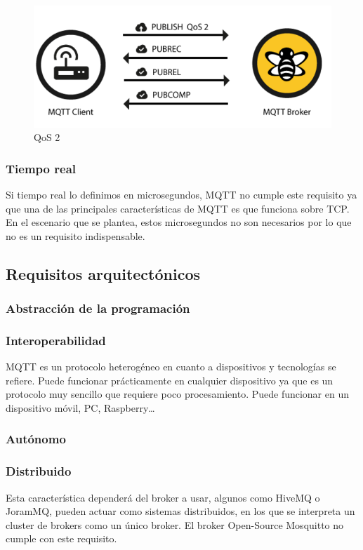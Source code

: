 \documentclass[12pt, twoside]{book}
\begin{document}
\begin{itemize}
\begin{figure}[h!]
\centering
\includegraphics[scale=0.3]{images/qos2}
\caption{QoS 2}\label{L408}
\end{figure}
\end{itemize}
\subsubsection*{Tiempo real}
Si tiempo real lo definimos en microsegundos, MQTT no cumple este requisito ya que una de las principales características de MQTT es que funciona sobre TCP. En el escenario que se plantea, estos microsegundos no son necesarios por lo que no es un requisito indispensable.
\subsection{Requisitos arquitectónicos}
\subsubsection*{Abstracción de la programación}

\subsubsection*{Interoperabilidad}
MQTT es un protocolo heterogéneo en cuanto a dispositivos y tecnologías se refiere. Puede funcionar prácticamente en cualquier dispositivo ya que es un protocolo muy sencillo que requiere poco procesamiento. Puede funcionar en un dispositivo móvil, PC, Raspberry…
\subsubsection*{Autónomo}

\subsubsection*{Distribuido}
Esta característica dependerá del broker a usar, algunos como HiveMQ o JoramMQ, pueden actuar como sistemas distribuidos, en los que se interpreta un cluster de brokers como un único broker.
El broker Open-Source Mosquitto no cumple con este requisito.
\end{document}
